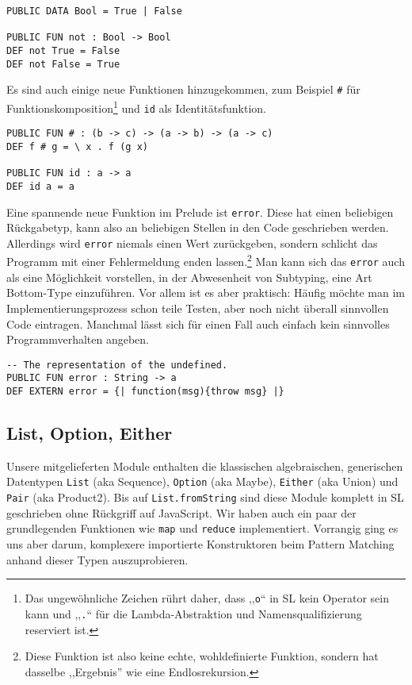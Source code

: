 \documentclass[runningheads]{llncs}
\begin{document}
\begin{verbatim}
PUBLIC DATA Bool = True | False

PUBLIC FUN not : Bool -> Bool
DEF not True = False
DEF not False = True
\end{verbatim}

Es sind auch einige neue Funktionen hinzugekommen, zum Beispiel \verb|#|
für Funktionskomposition\footnote{Das ungewöhnliche Zeichen rührt daher,
dass ,,\texttt{o}`` in SL kein Operator sein kann und ,,\texttt{.}`` für die
Lambda-Abstraktion und Namensqualifizierung reserviert ist.} und
\verb|id| als Identitätsfunktion.

\begin{verbatim}
PUBLIC FUN # : (b -> c) -> (a -> b) -> (a -> c)
DEF f # g = \ x . f (g x)

PUBLIC FUN id : a -> a
DEF id a = a
\end{verbatim}

Eine spannende neue Funktion im Prelude ist \verb|error|. Diese hat einen
beliebigen Rückgabetyp, kann also an beliebigen Stellen in den Code
geschrieben werden. Allerdings wird \verb|error| niemals einen Wert
zurückgeben, sondern schlicht das Programm mit einer Fehlermeldung enden
lassen.\footnote{Diese Funktion ist also keine echte, wohldefinierte Funktion,
sondern hat dasselbe ,,Ergebnis'' wie eine Endlosrekursion.} Man kann sich
das \verb|error| auch als eine Möglichkeit vorstellen, in der Abwesenheit von
Subtyping, eine Art Bottom-Type einzuführen. Vor allem ist es aber praktisch:
Häufig möchte man im Implementierungsprozess schon teile Testen, aber noch
nicht überall sinnvollen Code eintragen. Manchmal lässt sich für einen
Fall auch einfach kein sinnvolles Programmverhalten angeben.

\begin{verbatim}
-- The representation of the undefined.
PUBLIC FUN error : String -> a
DEF EXTERN error = {| function(msg){throw msg} |} 
\end{verbatim}

\subsection{List, Option, Either}

Unsere mitgelieferten Module enthalten die klassischen algebraischen,
generischen Datentypen \verb|List| (aka Sequence), \verb|Option| (aka Maybe),
\verb|Either| (aka Union) und \verb|Pair| (aka Product2).
Bis auf \verb|List.fromString| sind diese Module komplett in SL geschrieben
ohne Rückgriff auf JavaScript. Wir haben auch ein paar der grundlegenden
Funktionen wie \verb|map| und \verb|reduce| implementiert. Vorrangig ging
es uns aber darum, komplexere importierte Konstruktoren beim Pattern Matching
anhand dieser Typen auszuprobieren.
\end{document}

